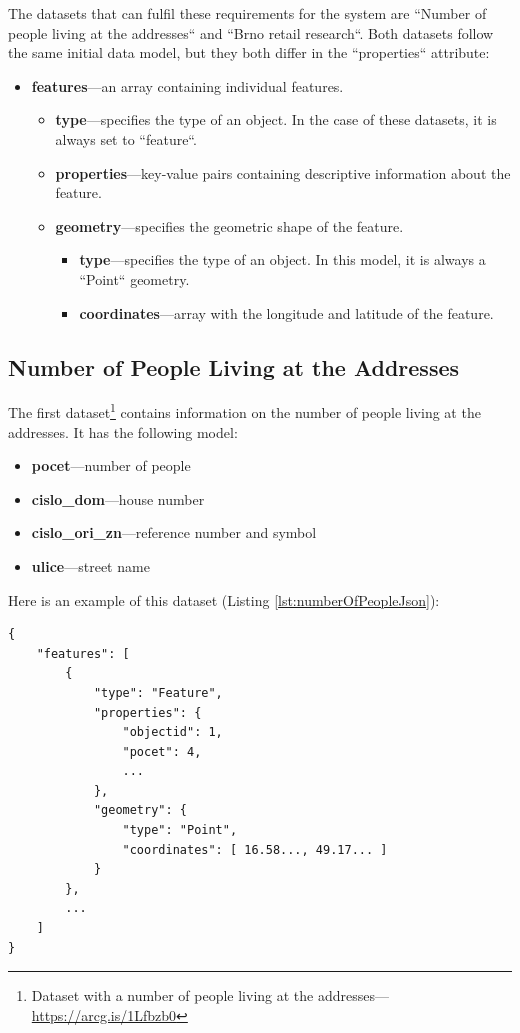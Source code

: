 The datasets that can fulfil these requirements for the system are ``Number of people living at the addresses`` and ``Brno retail research``. Both datasets follow the same initial data model, but they both differ in the ``properties`` attribute:

\begin{itemize}
    \item \textbf{features}---an array containing individual features.
    \begin{itemize}
        \item \textbf{type}---specifies the type of an object. In the case of these datasets, it is always set to ``feature``.
        \item \textbf{properties}---key-value pairs containing descriptive information about the feature.
        \item \textbf{geometry}---specifies the geometric shape of the feature.
        \begin{itemize}
            \item \textbf{type}---specifies the type of an object. In this model, it is always a ``Point`` geometry.
            \item \textbf{coordinates}---array with the longitude and latitude of the feature.
        \end{itemize}
    \end{itemize}
\end{itemize}

\subsection{Number of People Living at the Addresses}

The first dataset\footnote{Dataset with a number of people living at the addresses---\url{https://arcg.is/1Lfbzb0}} contains information on the number of people living at the addresses. It has the following model:

\begin{itemize}
    \item \textbf{pocet}---number of people
    \item \textbf{cislo\_dom}---house number
    \item \textbf{cislo\_ori\_zn}---reference number and symbol
    \item \textbf{ulice}---street name
\end{itemize}

Here is an example of this dataset (Listing \ref{lst:numberOfPeopleJson}):
\begin{lstlisting}[caption={Example of a ``Number of People Living at the Addresses`` dataset.}, label=lst:numberOfPeopleJson]
{
    "features": [
        { 
            "type": "Feature", 
            "properties": { 
                "objectid": 1, 
                "pocet": 4, 
                ...
            }, 
            "geometry": { 
                "type": "Point", 
                "coordinates": [ 16.58..., 49.17... ] 
            } 
        },
        ...
    ]
}
\end{lstlisting}

